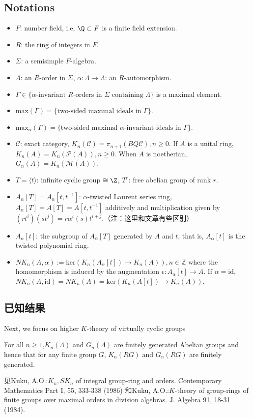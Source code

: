 \subsection{Notations}
\begin{itemize}
 	\item $F$: number field, i.e, $\Q\subset F$ is a finite field extension.
 	\item $R$: the ring of integers in $F$.
 	\item $\Sigma$: a semisimple $F$-algebra.
 	\item $\Lambda$: an $R$-order in $\Sigma$, $\alpha: \Lambda \rightarrow \Lambda$: an $R$-automorphism.
 	\item $\Gamma \in \{ \alpha\text{-invariant } R\text{-orders in } \Sigma \text{ containing } \Lambda\}$ is a maximal element.
 	\item $\mathrm{max}(\Gamma)=\{\text{two-sided maximal ideals in } \Gamma\}$.
 	\item $\mathrm{max}_{\alpha}(\Gamma)=\{\text{two-sided maximal $\alpha$-invariant ideals in } \Gamma\}$.
 	\item $\mathcal{C}$: exact category, $K_n(\mathcal{C})=\pi_{n+1}(BQ\mathcal{C}), n\geq 0$. If $A$ is a unital ring, $K_n(A)=K_n(\mathcal{P}(A)), n\geq 0$. When $A$ is noetherian, $G_n(A)=K_n(\mathcal{M}(A))$.
 	\item $T=\langle t\rangle$: infinite cyclic group $\cong \Z$, $T^r$: free abelian group of rank $r$.
 	\item $A_{\alpha}[T]=A_{\alpha}[t,t^{-1}]$: $\alpha$-twisted Laurent series ring, $A_{\alpha}[T]=A[T]=A[t,t^{-1}]$ additively and multiplication given by $(rt^i)(st^j)=r\alpha^i(s)t^{i+j}$.（注：这里和文章有些区别）
 	\item $A_{\alpha}[t]$: the subgroup of $A_{\alpha}[T]$ generated by $A$ and $t$, that is, $A_{\alpha}[t]$ is the twisted polynomial ring.
 	\item $NK_n(A,\alpha):=\mathrm{ker} (K_n(A_{\alpha} [t])\to K_n(A)),n\in \mathbb{Z}$ where the homomorphism is induced by the augmentation $\epsilon : A_{\alpha} [t]\to A$. If $\alpha = \mathrm{id}$, $NK_n(A,\mbox{id})=NK_n(A)=\mathrm{ker} (K_n(A[t])\to K_n(A))$.
 \end{itemize}

\subsection{已知结果}
Next, we focus on higher $K$-theory of virtually cyclic groups
\begin{theorem}[A. Kuku]
For all $n \geq 1$,$ K_n(\Lambda)$ and $G_n(\Lambda)$ are finitely generated Abelian groups and hence that for any finite group $G$, $K_n(RG)$ and $G_n
(RG)$ are finitely generated. 
\end{theorem}
见Kuku, A.O.:$K_n, SK_n$ of integral group-ring and orders. Contemporary Mathematics Part
I, 55, 333-338 (1986)
和Kuku, A.O.:$K$-theory of group-rings of finite groups over maximal orders in division algebras. J. Algebra 91, 18-31 (1984).

